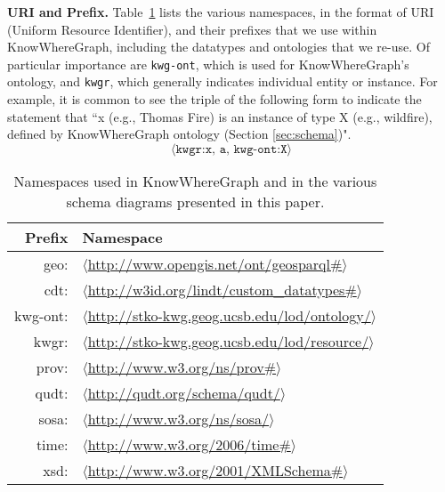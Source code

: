 \textbf{URI and Prefix.}
Table~\ref{tab:namespaces} lists the various namespaces, in the format of URI (Uniform Resource Identifier), and their prefixes that we use within KnowWhereGraph, including the datatypes and ontologies that we re-use. Of particular importance are \texttt{kwg-ont}, which is used for KnowWhereGraph's ontology, and \texttt{kwgr}, which generally indicates individual entity or instance. For example, it is common to see the triple of the following form to indicate the statement that ``x (e.g., Thomas Fire) is an instance of type X (e.g., wildfire), defined by KnowWhereGraph ontology (Section \ref{sec:schema})". 
\begin{equation*}
    \langle\texttt{kwgr:x, a, kwg-ont:X}\rangle
\end{equation*}

\begin{table}
    \centering
    \begin{tabular}{r|l}
Prefix   & Namespace \\\hline
geo:     & $\langle$\url{http://www.opengis.net/ont/geosparql#}$\rangle$\\
cdt:    & $\langle$\url{http://w3id.org/lindt/custom_datatypes#}$\rangle$\\
kwg-ont: & $\langle$\url{http://stko-kwg.geog.ucsb.edu/lod/ontology/}$\rangle$\\
kwgr:    & $\langle$\url{http://stko-kwg.geog.ucsb.edu/lod/resource/}$\rangle$\\
prov:    & $\langle$\url{http://www.w3.org/ns/prov#}$\rangle$\\
qudt:    & $\langle$\url{http://qudt.org/schema/qudt/}$\rangle$\\
sosa:    & $\langle$\url{http://www.w3.org/ns/sosa/}$\rangle$\\
time:    & $\langle$\url{http://www.w3.org/2006/time#}$\rangle$\\
xsd:     & $\langle$\url{http://www.w3.org/2001/XMLSchema#}$\rangle$
    \end{tabular}
    \caption{Namespaces used in KnowWhereGraph and in the various schema diagrams presented in this paper.} 
    \label{tab:namespaces}
\end{table}




